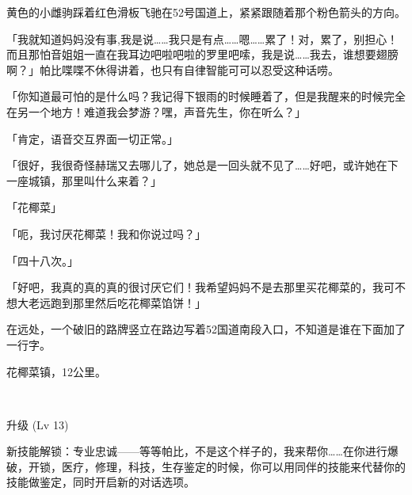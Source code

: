 \horizonline


黄色的小雌驹踩着红色滑板飞驰在52号国道上，紧紧跟随着那个粉色箭头的方向。

「我就知道妈妈没有事,我是说……我只是有点……嗯……累了！对，累了，别担心！而且那怕音姐姐一直在我耳边吧啦吧啦的罗里吧嗦，我是说……我去，谁想要翅膀啊？」帕比喋喋不休得讲着，也只有自律智能可可以忍受这种话唠。

「你知道最可怕的是什么吗？我记得下银雨的时候睡着了，但是我醒来的时候完全在另一个地方！难道我会梦游？嘿，声音先生，你在听么？」

「{\mt 肯定，语音交互界面一切正常。}」

「很好，我很奇怪赫瑞又去哪儿了，她总是一回头就不见了……好吧，或许她在下一座城镇，那里叫什么来着？」

「{\mt 花椰菜}」

「呃，我讨厌花椰菜！我和你说过吗？」

「{\mt 四十八次。}」

「好吧，我真的真的真的很讨厌它们！我希望妈妈不是去那里买花椰菜的，我可不想大老远跑到那里然后吃花椰菜馅饼！」

在远处，一个破旧的路牌竖立在路边写着52国道南段入口，不知道是谁在下面加了一行字。

\begin{center}
    花椰菜镇，12公里。
\end{center}

~\vfill

\begin{note}
    升级 (Lv 13) 

    新技能解锁：专业忠诚——等等帕比，不是这个样子的，我来帮你……在你进行爆破，开锁，医疗，修理，科技，生存鉴定的时候，你可以用同伴的技能来代替你的技能做鉴定，同时开启新的对话选项。
\end{note}



